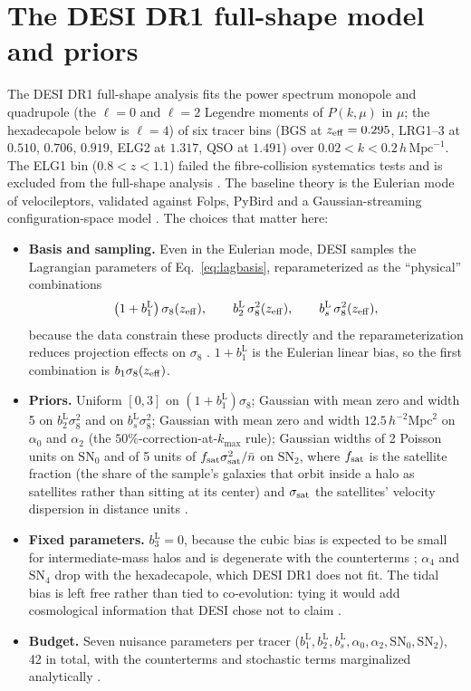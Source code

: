\documentclass[11pt]{article}
\newcommand{\bone}{b_1}            %
\newcommand{\boneL}{b_1^{\mathrm{L}}}
\newcommand{\btwoL}{b_2^{\mathrm{L}}}
\newcommand{\bsL}{b_s^{\mathrm{L}}}
\newcommand{\bthreeL}{b_3^{\mathrm{L}}}
\newcommand{\kmax}{k_{\mathrm{max}}}
\newcommand{\hMpc}{\,h\,\mathrm{Mpc}^{-1}}
\newcommand{\aunit}{\,h^{-2}\mathrm{Mpc}^2}
\newcommand{\SNz}{\mathrm{SN}_0}
\newcommand{\SNt}{\mathrm{SN}_2}
\begin{document}
\section{The DESI DR1 full-shape model and priors}
\label{sec:desi}

The DESI DR1 full-shape analysis \cite{DESI2024V,DESI2024VII} fits the
power spectrum monopole and quadrupole (the $\ell = 0$ and $\ell = 2$
Legendre moments of $P(k,\mu)$ in $\mu$; the hexadecapole below is
$\ell = 4$) of six tracer bins (BGS at
$z_{\rm eff}=0.295$, LRG1--3 at $0.510$, $0.706$, $0.919$, ELG2 at
$1.317$, QSO at $1.491$) over $0.02 < k < 0.2\hMpc$.  The ELG1 bin
($0.8<z<1.1$) failed the fibre-collision systematics tests and is
excluded from the full-shape analysis \cite{DESI2024V}.  The baseline
theory is the Eulerian mode of velocileptors, validated against Folps,
PyBird and a Gaussian-streaming configuration-space model
\cite{DESI2024V}.  The choices that matter here:

\begin{itemize}
\item \textbf{Basis and sampling.}  Even in the Eulerian mode, DESI
samples the Lagrangian parameters of Eq.~\eqref{eq:lagbasis},
reparameterized as the ``physical'' combinations
\begin{equation}
\left(1+\boneL\right)\sigma_8(z_{\rm eff}) , \qquad
\btwoL\,\sigma_8^2(z_{\rm eff}) , \qquad
\bsL\,\sigma_8^2(z_{\rm eff}) ,
\label{eq:physical-basis}
\end{equation}
because the data constrain these products directly and the
reparameterization reduces projection effects on $\sigma_8$
\cite{DESI2024V,DESI2024VII}.  $1+\boneL$ is the Eulerian linear bias,
so the first combination is $\bone\sigma_8(z_{\rm eff})$.
\item \textbf{Priors.}  Uniform $[0,3]$ on $(1+\boneL)\sigma_8$;
Gaussian with mean zero and width 5 on $\btwoL\sigma_8^2$ and on
$\bsL\sigma_8^2$; Gaussian with mean zero and width $12.5\aunit$ on
$\alpha_0$ and $\alpha_2$ (the $50\%$-correction-at-$\kmax$ rule);
Gaussian widths of 2 Poisson units on $\SNz$ and of 5 units of
$f_{\rm sat}\sigma_{\rm sat}^2/\bar{n}$ on $\SNt$, where $f_{\rm sat}$
is the satellite fraction (the share of the sample's galaxies that
orbit inside a halo as satellites rather than sitting at its center)
and $\sigma_{\rm sat}$ the satellites'
velocity dispersion in distance units \cite{DESI2024V,DESI2024VII}.
\item \textbf{Fixed parameters.}  $\bthreeL = 0$, because the cubic
bias is expected to be small for intermediate-mass halos and is
degenerate with the counterterms \cite{DESI2024V,Maus2024};
$\alpha_4$ and $\mathrm{SN}_4$ drop with the hexadecapole, which DESI
DR1 does not fit.  The tidal bias is left free rather than tied to
co-evolution: tying it would add cosmological information that DESI
chose not to claim \cite{DESI2024V}.
\item \textbf{Budget.}  Seven nuisance parameters per tracer
($\boneL,\btwoL,\bsL,\alpha_0,\alpha_2,\SNz,\SNt$), 42 in total, with
the counterterms and stochastic terms marginalized analytically
\cite{DESI2024VII}.
\end{itemize}
\end{document}
